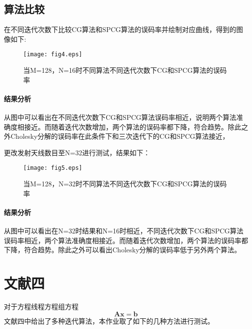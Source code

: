 \documentclass[twocolumn]{ctexart}
\begin{document}
\subsection{算法比较}
\par 在不同迭代次数下比较CG算法和SPCG算法的误码率并绘制对应曲线，得到的图像如下:
\begin{figure}[htpb]
\centering
\texttt{[image: fig4.eps]}
\caption{当M=128，N=16时不同算法不同迭代次数下CG和SPCG算法的误码率}
\end{figure}
\paragraph{结果分析} 从图中可以看出在不同迭代次数下CG和SPCG算法误码率相近，说明两个算法准确度相接近。而随着迭代次数增加，两个算法的误码率都下降，符合趋势。除此之外Cholesky分解的误码率在此条件下和三次迭代下的CG和SPCG算法接近，
\par 更改发射天线数目至N=32进行测试，结果如下：
\begin{figure}[htpb]
\centering
\texttt{[image: fig5.eps]}
\caption{当M=128，N=32时不同算法不同迭代次数下CG和SPCG算法的误码率}
\end{figure}
\paragraph{结果分析} 从图中可以看出在N=32时结果和N=16时相近，不同迭代次数下CG和SPCG算法误码率相近，两个算法准确度相接近。而随着迭代次数增加，两个算法的误码率都下降，符合趋势。除此之外可以看出Cholesky分解的误码率低于另外两个算法。
\section{文献四}
\par 对于方程线程方程组方程\[\mathbf{Ax=b}\]文献四中给出了多种迭代算法，本作业取了如下的几种方法进行测试。
\end{document}
